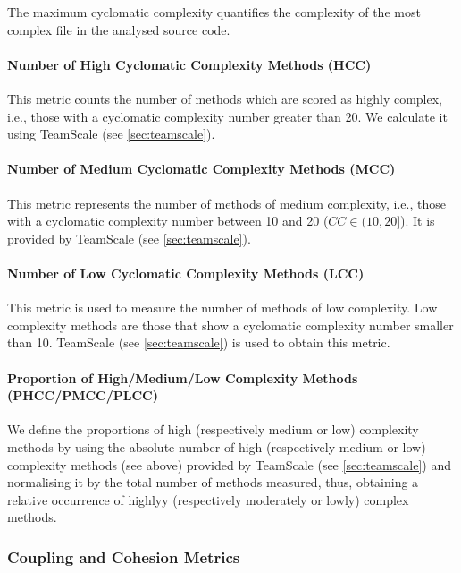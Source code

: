 \documentclass{scrartcl}
\begin{document}
The maximum cyclomatic complexity quantifies the complexity of the most complex
file in the analysed source code.

\paragraph{Number of High Cyclomatic Complexity Methods (HCC)}

This metric counts the number of methods which are scored as highly complex,
i.e., those with a cyclomatic complexity number greater than 20. We calculate it
using TeamScale (see \ref{sec:teamscale}).

\paragraph{Number of Medium Cyclomatic Complexity Methods (MCC)}

This metric represents the number of methods of medium complexity, i.e., those
with a cyclomatic complexity number between 10 and 20 ($CC \in (10, 20]$). It is
provided by TeamScale (see \ref{sec:teamscale}).

\paragraph{Number of Low Cyclomatic Complexity Methods (LCC)}

This metric is used to measure the number of methods of low complexity. Low
complexity methods are those that show a cyclomatic complexity number smaller
than 10. TeamScale (see \ref{sec:teamscale}) is used to obtain this metric.

\paragraph{Proportion of High/Medium/Low Complexity Methods (PHCC/PMCC/PLCC)}

We define the proportions of high (respectively medium or low) complexity
methods by using the absolute number of high (respectively medium or low)
complexity methods (see above)  provided by TeamScale (see \ref{sec:teamscale})
and normalising it by the total number of methods measured, thus, obtaining a
relative occurrence of highlyy (respectively moderately or lowly) complex
methods.

\subsubsection{Coupling and Cohesion Metrics}
\end{document}
